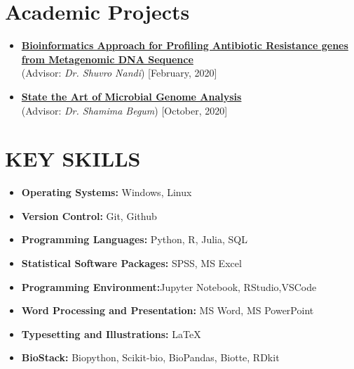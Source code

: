 \documentclass[11pt,a4paper]{moderncv}
\begin{document}
\section{Academic Projects}
\begin{itemize}	
	\item 
	\textbf{\href{https://github.com/hossainlab/ARGs}{Bioinformatics
	 Approach for Profiling Antibiotic Resistance genes from Metagenomic DNA 
	Sequence}} \\  (Advisor: \textit{Dr. Shuvro 
	Nandi}) \hfill [February, 2020]
	\item\textbf{\href{https://github.com/hossainlab/ArtofGenomeAnalysis}{State 
	the Art of Microbial Genome Analysis}} \\  (Advisor: 
	\textit{Dr. Shamima Begum}) \hfill [October, 2020]
\end{itemize}


\section{KEY SKILLS}

\begin{multicols}{2}
	\begin{itemize}
		\item \textbf{Operating Systems:} Windows, Linux
		\item \textbf{Version Control:} Git, Github
	    \item \textbf{Programming Languages:} Python, R, Julia, SQL
		\item \textbf{Statistical Software Packages:} SPSS, MS Excel
		
	\end{itemize}
	\columnbreak 
	\begin{itemize}
		\item \textbf{Programming Environment:}Jupyter Notebook,
		 RStudio,VSCode
		\item \textbf{Word Processing and Presentation:} MS Word, MS PowerPoint
		\item \textbf{Typesetting and Illustrations:} \LaTeX
		\item \textbf{BioStack:} Biopython, Scikit-bio, BioPandas, Biotte, RDkit
	\end{itemize}
\end{multicols} 
\end{document}
